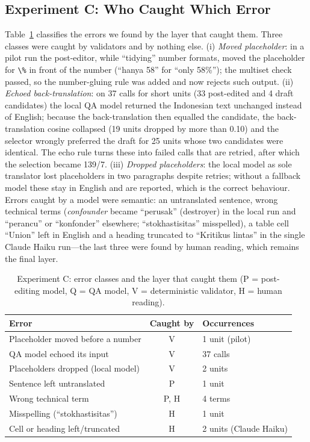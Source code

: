 \subsection{Experiment C: Who Caught Which Error}
Table~\ref{tab:errors} classifies the errors we found by the layer that caught them. Three classes were caught by validators and by nothing else. (i) \emph{Moved placeholder}: in a pilot run the post-editor, while ``tidying'' number formats, moved the placeholder for \verb|\%| in front of the number (``hanya 58'' for ``only 58\%''); the multiset check passed, so the number-gluing rule was added and now rejects such output. (ii) \emph{Echoed back-translation}: on 37 calls for short units (33 post-edited and 4 draft candidates) the local QA model returned the Indonesian text unchanged instead of English; because the back-translation then equalled the candidate, the back-translation cosine collapsed (19 units dropped by more than 0.10) and the selector wrongly preferred the draft for 25 units whose two candidates were identical. The echo rule turns these into failed calls that are retried, after which the selection became 139/7. (iii) \emph{Dropped placeholders}: the local model as sole translator lost placeholders in two paragraphs despite retries; without a fallback model these stay in English and are reported, which is the correct behaviour. Errors caught by a model were semantic: an untranslated sentence, wrong technical terms (\emph{confounder} became ``perusak'' (destroyer) in the local run and ``perancu'' or ``konfonder'' elsewhere; ``stokhastisitas'' misspelled), a table cell ``Union'' left in English and a heading truncated to ``Kritikus lintas'' in the single Claude Haiku run---the last three were found by human reading, which remains the final layer.

\begin{table}[t]
  \caption{Experiment C: error classes and the layer that caught them (P = post-editing model, Q = QA model, V = deterministic validator, H = human reading).}
  \label{tab:errors}
  \centering
  \small
  \begin{tabular}{@{}p{4.1cm}cp{2.6cm}@{}}
    \toprule
    Error & Caught by & Occurrences \\
    \midrule
    Placeholder moved before a number & V & 1 unit (pilot) \\
    QA model echoed its input & V & 37 calls \\
    Placeholders dropped (local model) & V & 2 units \\
    Sentence left untranslated & P & 1 unit \\
    Wrong technical term & P, H & 4 terms \\
    Misspelling (``stokhastisitas'') & H & 1 unit \\
    Cell or heading left/truncated & H & 2 units (Claude Haiku) \\
    \bottomrule
  \end{tabular}
\end{table}


